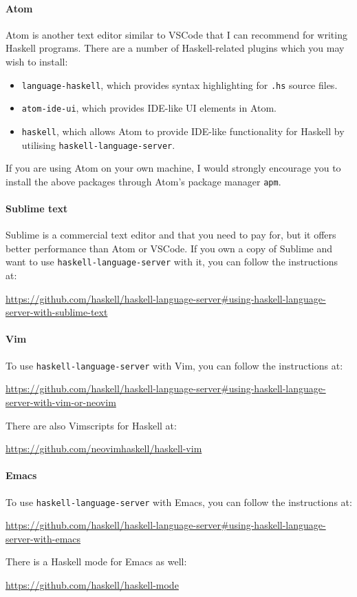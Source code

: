 \paragraph{Atom} Atom is another text editor similar to VSCode that I can recommend for writing Haskell programs. There are a number of Haskell-related plugins which you may wish to install:
\begin{itemize}
	\item \texttt{\small language-haskell}, which provides syntax highlighting for \texttt{\small .hs} source files.
	\item \texttt{\small atom-ide-ui}, which provides IDE-like UI elements in Atom.
	\item \texttt{\small haskell}, which allows Atom to provide IDE-like functionality for Haskell by utilising \texttt{\small haskell-language-server}. 
\end{itemize}
If you are using Atom on your own machine, I would strongly encourage you to install the above packages through Atom's package manager \texttt{\small apm}.

\paragraph{Sublime text} Sublime is a commercial text editor and that you need to pay for, but it offers better performance than Atom or VSCode. If you own a copy of Sublime and want to use \texttt{\small haskell-language-server} with it, you can follow the instructions at:
\begin{center}\small 
	\url{https://github.com/haskell/haskell-language-server\#using-haskell-language-server-with-sublime-text}
\end{center}

\paragraph{Vim} To use \texttt{\small haskell-language-server} with Vim, you can follow the instructions at:
\begin{center}\small
	\url{https://github.com/haskell/haskell-language-server\#using-haskell-language-server-with-vim-or-neovim}
\end{center}
There are also Vimscripts for Haskell at:
\begin{center}\small
\url{https://github.com/neovimhaskell/haskell-vim}
\end{center}

\paragraph{Emacs} To use \texttt{\small haskell-language-server} with Emacs, you can follow the instructions at:
\begin{center}\small
	\parbox{13cm}{\centering\url{https://github.com/haskell/haskell-language-server\#using-haskell-language-server-with-emacs}}
\end{center}
There is a Haskell mode for Emacs as well:
\begin{center} \small
\url{https://github.com/haskell/haskell-mode}
\end{center}

